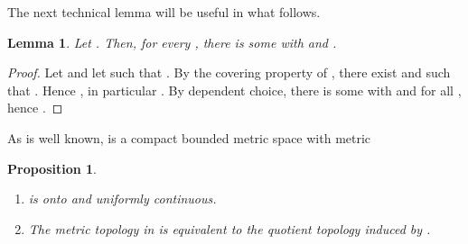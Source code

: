 \documentclass[microtype]{jloganal}
\theoremstyle{plain}
\newtheorem{lemma}[theorem]{Lemma}
\newtheorem{proposition}[theorem]{Proposition}
\theoremstyle{definition}
\begin{document}
The next technical lemma will be useful in what follows.

\begin{lemma}\label{lem-gensur}
Let . Then, for every , there is some  with  and .
\end{lemma}
\begin{proof}
Let  and let  such that . 
By the covering property of , there exist  and  such that .
Hence , in particular . 
By dependent choice, there is
some  with  and 
 for all , hence .
\end{proof} 

As is well known, 
 is a compact bounded metric space with metric


\begin{proposition}\label{prop-valcont}
\begin{enumerate}
\item \label{valcont1}  is onto and uniformly continuous.  
\item \label{valcont2} The metric topology in  is equivalent to the quotient topology induced by .
\end{enumerate}
\end{proposition}
\end{document}
